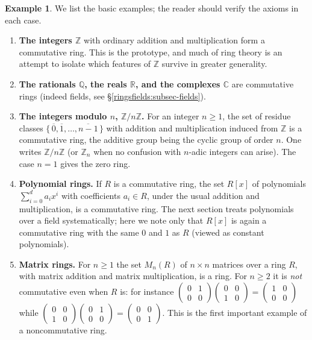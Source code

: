 \documentclass[11pt,a4paper]{article}
\theoremstyle{definition}
\newtheorem{example}[theorem]{Example}
\theoremstyle{remark}
\newcommand{\Z}{\ensuremath{\mathbb{Z}}}
\newcommand{\Q}{\ensuremath{\mathbb{Q}}}
\newcommand{\R}{\ensuremath{\mathbb{R}}}
\providecommand{\C}{}\renewcommand{\C}{\ensuremath{\mathbb{C}}}
\begin{document}
\begin{example}\label{ringsfields:exa-rings}
We list the basic examples; the reader should verify the axioms in each case.
\begin{enumerate}
\item \textbf{The integers \(\Z\)} with ordinary addition and multiplication form a commutative ring. This is the prototype, and much of ring theory is an attempt to isolate which features of \(\Z\) survive in greater generality.
\item \textbf{The rationals \(\Q\), the reals \(\R\), and the complexes \(\C\)} are commutative rings (indeed fields, see \S\ref{ringsfields:subsec-fields}).
\item \textbf{The integers modulo \(n\), \(\Z/n\Z\).} For an integer \(n\geq 1\), the set of residue classes \(\{\,\overline 0,\overline 1,\dots,\overline{n-1}\,\}\) with addition and multiplication induced from \(\Z\) is a commutative ring, the additive group being the cyclic group of order \(n\). One writes \(\Z/n\Z\) (or \(\Z_n\) when no confusion with \(n\)-adic integers can arise). The case \(n=1\) gives the zero ring.
\item \textbf{Polynomial rings.} If \(R\) is a commutative ring, the set \(R[x]\) of polynomials \(\sum_{i=0}^d a_i x^i\) with coefficients \(a_i\in R\), under the usual addition and multiplication, is a commutative ring. The next section treats polynomials over a field systematically; here we note only that \(R[x]\) is again a commutative ring with the same \(0\) and \(1\) as \(R\) (viewed as constant polynomials).
\item \textbf{Matrix rings.} For \(n\geq 1\) the set \(M_n(R)\) of \(n\times n\) matrices over a ring \(R\), with matrix addition and matrix multiplication, is a ring. For \(n\geq 2\) it is \emph{not} commutative even when \(R\) is: for instance \(\left(\begin{smallmatrix}0&1\\0&0\end{smallmatrix}\right)\left(\begin{smallmatrix}0&0\\1&0\end{smallmatrix}\right) = \left(\begin{smallmatrix}1&0\\0&0\end{smallmatrix}\right)\) while \(\left(\begin{smallmatrix}0&0\\1&0\end{smallmatrix}\right)\left(\begin{smallmatrix}0&1\\0&0\end{smallmatrix}\right) = \left(\begin{smallmatrix}0&0\\0&1\end{smallmatrix}\right)\). This is the first important example of a noncommutative ring.

\end{enumerate}
\end{example}
\end{document}
